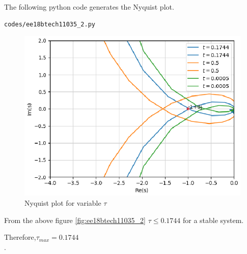 The following python code generates the Nyquist plot.
\begin{lstlisting}
codes/ee18btech11035_2.py
\end{lstlisting}

\begin{figure}[!h]
  \includegraphics[width=\columnwidth]{./figs/ee18btech11035_2.eps}
  \caption{Nyquist plot for variable $\tau$}
  \label{fig:ee18btech11035_2}
\end{figure}

From the above figure \eqref{fig:ee18btech11035_2} $\tau \le 0.1744$ for a stable system.

\begin{table}[!ht]
\centering

\caption{}
\label{table:ee18btech11035_table}
\end{table}

Therefore,$\tau_{max} = 0.1744 $\\.
